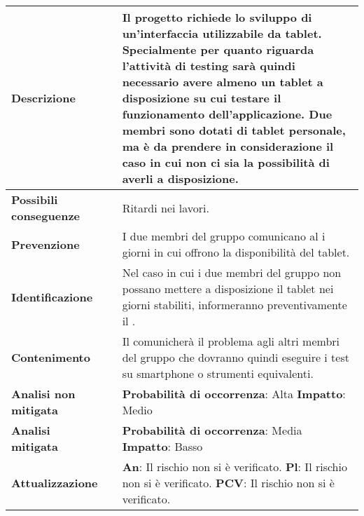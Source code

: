 \small
\begin{table}[H]
	\begin{center}			
		\begin{tabular}{p{2.5cm}p{0.5cm}p{11cm}}
			\arrayrulecolor{lightgray}
			
			\toprule				
			\textbf{Descrizione}
			& &
			Il progetto richiede lo sviluppo di un'interfaccia utilizzabile da tablet. Specialmente per quanto riguarda l'attività di testing sarà quindi necessario avere almeno un tablet a disposizione su cui testare il funzionamento dell'applicazione. Due membri sono dotati di tablet personale, ma è da prendere in considerazione il caso in cui non ci sia la possibilità di averli a disposizione.
			\\
			\midrule
			\textbf{Possibili \newline conseguenze}
			& &
			Ritardi nei lavori.
			\\
			\midrule
			\textbf{Prevenzione}
			& &
			I due membri del gruppo comunicano al \responsabilediprogetto{} i giorni in cui offrono la disponibilità del tablet.
			\\
			\midrule
			\textbf{Identificazione}
			& &
			Nel caso in cui i due membri del gruppo non possano mettere a disposizione il tablet nei giorni stabiliti, informeranno preventivamente il \responsabilediprogetto{}.
			\\
			\midrule
			\textbf{Contenimento}
			& &
			Il \responsabilediprogetto{} comunicherà il problema agli altri membri del gruppo che dovranno quindi eseguire i test su smartphone o strumenti equivalenti.
			\\
			\midrule
			\textbf{Analisi \newline non mitigata}
			& &
			\textbf{Probabilità di occorrenza}: Alta
			\newline
			\textbf{Impatto}: Medio
			\\
			\midrule
			\textbf{Analisi \newline mitigata}
			& &
			\textbf{Probabilità di occorrenza}: Media
			\newline
			\textbf{Impatto}: Basso
			\\
			\midrule
			\textbf{Attualizzazione}
			& &
			\textbf{An}: Il rischio non si è verificato.
			\newline
			\textbf{Pl}: Il rischio non si è verificato.
			\newline
			\textbf{PCV}: Il rischio non si è verificato.
			\\
			
			\bottomrule	
		\end{tabular}
	\end{center}
\end{table}			

